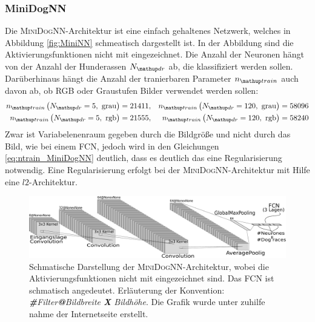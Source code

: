  \subsubsection{MiniDogNN}
 Die \textsc{MiniDogNN}-Architektur ist eine einfach gehaltenes Netzwerk, welches
 in Abbildung \ref{fig:MiniNN} schmeatisch dargestellt ist. In der Abbildung sind
 die Aktivierungsfunktionen nicht mit eingezeichnet. Die Anzahl der Neuronen
 hängt von der Anzahl der Hunderassen $N\ua{dr}$ ab, die klassifiziert werden sollen.
 Darüberhinaus hängt die Anzahl der tranierbaren Parameter $n\ua{train}$ auch davon ab, ob \textsc{RGB} oder
 Graustufen Bilder verwendet werden sollen:
 \begin{align}
   \begin{aligned}
     \label{eq: ntrain_MiniDogNN}
   n\ua{train}\left(N\ua{dr}=5, \,\, \mathrm{grau}\right) &= 21411, & n\ua{train}\left(N\ua{dr}=120, \,\, \mathrm{grau}\right) & = 58096 \\
   n\ua{train}\left(N\ua{dr}=5, \,\, \mathrm{rgb}\right) &= 21555, & n\ua{train}\left(N\ua{dr}=120, \,\, \mathrm{rgb}\right) & = 58240
   \end{aligned}
 \end{align}
 Zwar ist Variabelenenraum gegeben durch die Bildgröße und nicht durch das Bild, wie
 bei einem FCN, jedoch wird in den Gleichungen \eqref{eq:ntrain_MiniDogNN} deutlich,
 dass es deutlich das eine Regularisierung notwendig. Eine Regularisierung
 erfolgt bei der \textsc{MiniDogNN}-Architektur mit Hilfe eine $l2$-Architektur.
 \begin{figure}
 \centering
 \includegraphics[width=\the\textwidth]{../../final_data/general/MiniDogNN.pdf}
 \caption{Schmatische Darstellung der \textsc{MiniDogNN}-Architektur, wobei
          die Aktivierungsfunktionen nicht mit eingezeichnet sind. Das FCN
          ist schmatisch angedeutet. Erläuterung der Konvention: \emph{\textbf{\#}Filter\textbf{@}Bildbreite \textbf{X} Bildhöhe}.
          Die Grafik wurde unter zuhilfe nahme der Internetseite \cite{net_svg_source} erstellt.}
 \label{fig:MiniDogNN}
 \end{figure}

